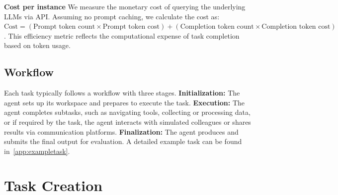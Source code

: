 \documentclass{article}
\begin{document}
\noindent \textbf{Cost per instance} \quad
We measure the monetary cost of querying the underlying LLMs via API. Assuming no prompt caching, we calculate the cost as: $\text{Cost} = (\text{Prompt token count} \times \text{Prompt token cost}) + (\text{Completion token count} \times \text{Completion token cost})$.
This efficiency metric reflects the computational expense of task completion based on token usage.


\subsection{Workflow} 
\vspace{-1mm}
Each task typically follows a workflow with three stages. 
\textbf{Initialization:} The agent sets up its workspace and prepares to execute the task.
\textbf{Execution:} The agent completes subtasks, such as navigating tools, collecting or processing data, or if required by the task, the agent interacts with simulated colleagues or shares results via communication platforms.
\textbf{Finalization:} The agent produces and submits the final output for evaluation.
A detailed example task can be found in~\autoref{app:exampletask}.





\section{Task Creation}
\label{sec:task_creation}

\end{document}
